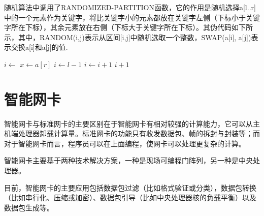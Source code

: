 随机算法中调用了RANDOMIZED-PARTITION函数，它的作用是随机选择a[l..r]中的一个元素作为关键字，将比关键字小的元素都放在关键字左侧（下标小于关键字所在下标），其余元素放在右侧（下标大于关键字所在下标）。其伪代码如下所示，其中，RANDOM(i,j)表示从区间[i,j]中随机选取一个整数，SWAP(a[i], a[j])表示交换a[i]和a[j]的值.

\makeatletter
\def\BState{\State\hskip-\ALG@thistlm}
\makeatother
\begin{algorithm}
\begin{algorithmic}[1]
\State $i \gets$ 
\State {}
\State $x \gets a[r]$
\State $i \gets l - 1$
\State $i \gets i + 1$
\State {}
\EndIf
\EndFor
\State {}
\State \Return $i + 1$
\EndProcedure
\end{algorithmic}
\end{algorithm}

\section{智能网卡}
智能网卡与标准网卡的主要区别在于智能网卡有相对较强的计算能力，它可以从主机端处理器卸载计算量。标准网卡的功能只有收发数据包、帧的拆封与封装等；而对于智能网卡而言，程序员可以在上面编程，使网卡可以处理更复杂的计算。

智能网卡主要基于两种技术解决方案，一种是现场可编程门阵列，另一种是中央处理器。

目前，智能网卡的主要应用包括数据包过滤（比如格式验证或分类），数据包转换（比如串行化、压缩或加密）、数据包引导（比如中央处理器核的负载平衡）以及数据包生成等。